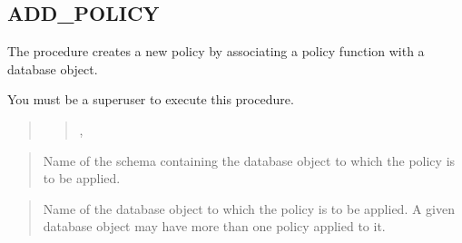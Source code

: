 \documentclass[letterpaper,10pt,english,openany,oneside]{sphinxmanual}
\begin{document}
\newpage

\ignorespaces 

\subsection{ADD\_POLICY}
\label{\detokenize{dbms_rls:add-policy}}\label{\detokenize{dbms_rls:index-1}}
The  procedure creates a new policy by associating a policy
function with a database object.

You must be a superuser to execute this procedure.
\begin{quote}

\begin{quote}

,


\sphinxcode{{[}, \textless{}statement\_types\textgreater{} VARCHAR2}

\sphinxcode{{[}, \textless{}update\_check\textgreater{} BOOLEAN}

\sphinxcode{{[}, \textless{}enable\textgreater{} BOOLEAN}

\sphinxcode{{[}, \textless{}static\_policy\textgreater{} BOOLEAN}

\sphinxcode{{[}, \textless{}policy\_type\textgreater{} INTEGER}

\sphinxcode{{[}, \textless{}long\_predicate\textgreater{} BOOLEAN}

\sphinxcode{{[}, \textless{}sec\_relevant\_cols\textgreater{} VARCHAR2}

\sphinxcode{{[}, \textless{}sec\_relevant\_cols\_opt\textgreater{} INTEGER {]}{]}{]}{]}{]}{]}{]}{]})}
\end{quote}
\end{quote}


\begin{quote}

Name of the schema containing the database object to which the policy is
to be applied.
\end{quote}

\begin{quote}

Name of the database object to which the policy is to be applied. A
given database object may have more than one policy applied to it.
\end{quote}
\end{document}
